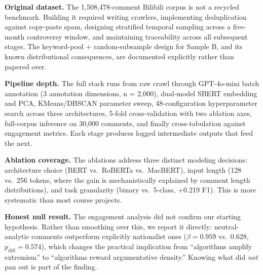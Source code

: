 \documentclass[letterpaper]{article}
\begin{document}
\textbf{Original dataset.} The 1,508,478-comment Bilibili corpus is not a recycled benchmark. Building it required writing crawlers, implementing deduplication against copy-paste spam, designing stratified temporal sampling across a five-month controversy window, and maintaining traceability across all subsequent stages. The keyword-pool + random-subsample design for Sample B, and its known distributional consequences, are documented explicitly rather than papered over.

\textbf{Pipeline depth.} The full stack runs from raw crawl through GPT-4o-mini batch annotation (3 annotation dimensions, n = 2,000), dual-model SBERT embedding and PCA, KMeans/DBSCAN parameter sweep, 48-configuration hyperparameter search across three architectures, 5-fold cross-validation with two ablation axes, full-corpus inference on 30,000 comments, and finally cross-tabulation against engagement metrics. Each stage produces logged intermediate outputs that feed the next.

\textbf{Ablation coverage.} The ablations address three distinct modeling decisions: architecture choice (BERT vs.\ RoBERTa vs.\ MacBERT), input length (128 vs.\ 256 tokens, where the gain is mechanistically explained by comment length distributions), and task granularity (binary vs.\ 5-class, +0.219 F1). This is more systematic than most course projects.

\textbf{Honest null result.} The engagement analysis did not confirm our starting hypothesis. Rather than smoothing over this, we report it directly: neutral-analytic comments outperform explicitly nationalist ones ($\beta = 0.959$ vs.\ $0.628$, $p_{\text{diff}} = 0.574$), which changes the practical implication from ``algorithms amplify extremism'' to ``algorithms reward argumentative density.'' Knowing what did \textit{not} pan out is part of the finding.
\end{document}
